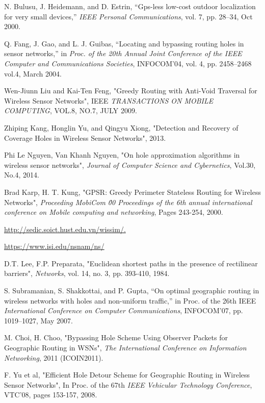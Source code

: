 \documentclass[12pt]{report}
\begin{document}
\begin{thebibliography}{100}
N. Bulusu, J. Heidemann, and D. Estrin, “Gps-less low-cost outdoor localization
for very small devices,” \textit{IEEE Personal Communications}, vol. 7, pp. 28–34, Oct
2000.

Q. Fang, J. Gao, and L. J. Guibas, “Locating and bypassing routing holes in sensor networks,” in \textit{Proc. of the 20th Annual Joint Conference of the IEEE Computer and Communications Societies}, INFOCOM’04, vol. 4, pp. 2458–2468 vol.4, March 2004.

Wen-Jiunn Liu and Kai-Ten Feng, "Greedy Routing with Anti-Void Traversal for Wireless Sensor Networks", IEEE \textit{TRANSACTIONS ON MOBILE COMPUTING}, VOL.8, NO.7, JULY 2009.

Zhiping Kang, Honglin Yu, and Qingyu Xiong, "Detection and Recovery of Coverage
Holes in Wireless Sensor Networks", 2013.

Phi Le Nguyen, Van Khanh Nguyen, "On hole approximation algorithms in wireless sensor networks", \textit{Journal of Computer Science and Cybernetics},  Vol.30, No.4, 2014.

Brad Karp, H. T. Kung, "GPSR: Greedy Perimeter Stateless Routing for Wireless
Networks", \textit{Proceeding MobiCom \'00 Proceedings of the 6th annual international conference on Mobile computing and networking}, Pages 243-254, 2000.

\url{http://sedic.soict.hust.edu.vn/wissim/.}

\url{https://www.isi.edu/nsnam/ns/}

D.T. Lee, F.P. Preparata, "Euclidean shortest paths in the presence of rectilinear barriers", \textit{Networks}, vol. 14, no. 3, pp. 393-410, 1984.

S. Subramanian, S. Shakkottai, and P. Gupta, “On optimal geographic routing
in wireless networks with holes and non-uniform traffic,” in Proc. of the 26th
IEEE \textit{International Conference on Computer Communications}, INFOCOM’07,
pp. 1019–1027, May 2007.

M. Choi, H. Choo, "Bypassing Hole Scheme Using Observer Packets for Geographic Routing in WSNs", \textit{The International Conference on Information Networking}, 2011 (ICOIN2011).

F. Yu et al, "Efficient Hole Detour Scheme for Geographic Routing in Wireless Sensor Networks", In Proc. of the 67th \textit{IEEE Vehicular Technology Conference}, VTC'08, pages 153-157, 2008.


\end{thebibliography}
\end{document}
